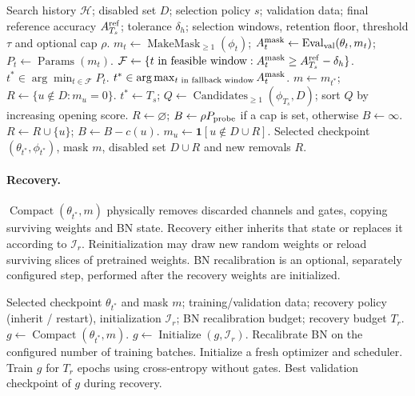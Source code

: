 \begin{algorithm*}[!t]
\caption{Checkpoint Selection: choose the search checkpoint and fixed mask.}
\label{alg:selection-phase}
\begin{algorithmic}[1]
\REQUIRE Search history $\mathcal H$; disabled set $D$; selection policy $s$;
validation data; final reference accuracy $A_{T_s}^{\rm ref}$;
tolerance $\delta_h$; selection windows, retention floor, threshold $\tau$ and optional cap $\rho$.
\STATE $m_t\gets\operatorname{MakeMask}_{\geq1}(\phi_t)$;
$A_t^{\rm mask}\gets\operatorname{Eval}_{\rm val}(\theta_t,m_t)$;
$P_t\gets\operatorname{Params}(m_t)$.
\ENDFOR
\STATE $\mathcal F\gets\{t\text{ in feasible window}:A_t^{\rm mask}\geq A_{T_s}^{\rm ref}-\delta_h\}$.
\STATE $t^*\in\arg\min_{t\in\mathcal F}P_t$.
\ELSE
\STATE $t^*\in\arg\max_{t\text{ in fallback window}}A_t^{\rm mask}$.
\ENDIF
\STATE $m\gets m_{t^*}$; $R\gets\{u\notin D:m_u=0\}$.
\ELSE
\STATE $t^*\gets T_s$; $Q\gets\operatorname{Candidates}_{\geq1}(\phi_{T_s},D)$;
sort $Q$ by increasing opening score.
\STATE $R\gets\varnothing$;
$B\gets\rho P_{\rm probe}$ if a cap is set, otherwise $B\gets\infty$.
\STATE $R\gets R\cup\{u\}$; $B\gets B-c(u)$.
\ENDIF
\ENDFOR
\STATE $m_u\gets\mathbf1[u\notin D\cup R]$.
\ENDIF
\RETURN Selected checkpoint $(\theta_{t^*},\phi_{t^*})$, mask $m$, disabled set $D\cup R$ and new removals $R$.
\end{algorithmic}
\end{algorithm*}

\paragraph{Recovery.}
$\operatorname{Compact}(\theta_{t^*},m)$ physically removes discarded
channels and gates, copying surviving weights and BN state. Recovery
either inherits that state or replaces it according to $\mathcal I_r$.
Reinitialization may draw new random weights or reload surviving slices
of pretrained weights. BN recalibration is an optional, separately
configured step, performed after the recovery weights are initialized.

\begin{algorithm*}[!t]
\caption{Recovery: train and validate the compact, gate-free network.}
\label{alg:recovery-phase}
\begin{algorithmic}[1]
\REQUIRE Selected checkpoint $\theta_{t^*}$ and mask $m$; training/validation data;
recovery policy (inherit / restart), initialization $\mathcal I_r$;
BN recalibration budget; recovery budget $T_r$.
\STATE $g\gets\operatorname{Compact}(\theta_{t^*},m)$.
\STATE $g\gets\operatorname{Initialize}(g,\mathcal I_r)$.
\ENDIF
{}
\STATE Recalibrate BN on the configured number of training batches.
\ENDIF
\STATE Initialize a fresh optimizer and scheduler.
\STATE Train $g$ for $T_r$ epochs using cross-entropy without gates.
\RETURN Best validation checkpoint of $g$ during recovery.
\end{algorithmic}
\end{algorithm*}
